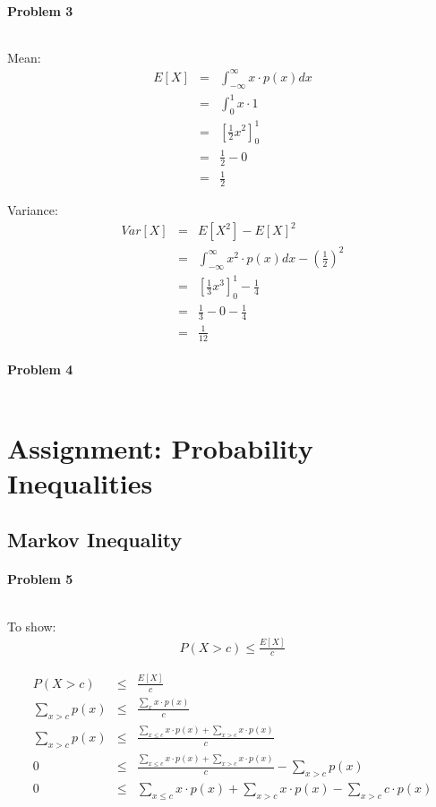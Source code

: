 \documentclass{article}
\begin{document}
\paragraph*{Problem 3}
$\;$ 

Mean:
\begin{eqnarray}
E[X] &=& \int_{-\infty}^{\infty}x \cdot p(x) dx\\
&=& \int_0^1 x \cdot 1\\
&=& \left[ \frac{1}{2} x^2\right] _0^1\\
&=& \frac{1}{2} - 0\\
&=& \frac{1}{2}
\end{eqnarray}

Variance:
\begin{eqnarray}
Var[X] &=& E[X^2] - E[X]^2\\
&=& \int_{-\infty}^{\infty}x^2 \cdot p(x) dx - \left(\frac{1}{2}\right)^2\\
&=& \left[\frac{1}{3} x^3\right]_0^1 - \frac{1}{4}\\
&=& \frac{1}{3} - 0 - \frac{1}{4}\\
&=& \frac{1}{12}
\end{eqnarray}

\paragraph*{Problem 4}
$\;$ 


\section{Assignment: Probability Inequalities}
\subsection{Markov Inequality}

\paragraph*{Problem 5}
$\;$ 

To show:
\begin{eqnarray}
P(X > c) \leq \frac{E[X]}{c}
\end{eqnarray}

\begin{eqnarray}
P(X > c) &\leq& \frac{E[X]}{c}\\
\sum_{x>c}{p(x)} &\leq& \frac{\sum_{x}{x \cdot p(x)}}{c}\\
\sum_{x>c}{p(x)} &\leq& \frac{\sum_{x\leq c}{x \cdot p(x)} + \sum_{x>c}{x \cdot p(x)}}{c}\\
0 &\leq& \frac{\sum_{x\leq c}{x \cdot p(x)} + \sum_{x>c}{x \cdot p(x)}}{c} - \sum_{x>c}{p(x)}\\
0 &\leq& \sum_{x\leq c}{x \cdot p(x)} + \sum_{x>c}{x \cdot p(x)} - \sum_{x>c}{ c \cdot p(x)} \label{3sums}
\end{eqnarray}
\end{document}
